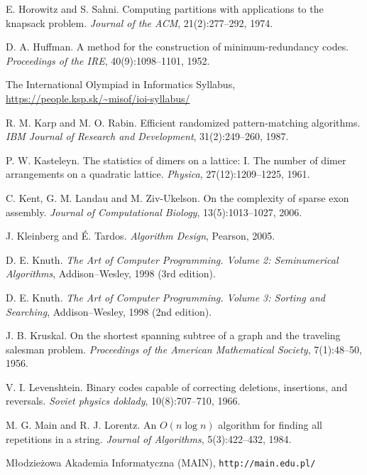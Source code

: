\begin{thebibliography}{9}
  E. Horowitz and S. Sahni.
  Computing partitions with applications to the knapsack problem.
  \emph{Journal of the ACM}, 21(2):277--292, 1974.

  D. A. Huffman.
  A method for the construction of minimum-redundancy codes.
  \emph{Proceedings of the IRE}, 40(9):1098--1101, 1952.

  The International Olympiad in Informatics Syllabus,
  \url{https://people.ksp.sk/~misof/ioi-syllabus/}

  R. M. Karp and M. O. Rabin.
  Efficient randomized pattern-matching algorithms.
  \emph{IBM Journal of Research and Development}, 31(2):249--260, 1987.

  P. W. Kasteleyn.  
  The statistics of dimers on a lattice: I. The number of dimer arrangements on a quadratic lattice.
  \emph{Physica}, 27(12):1209--1225, 1961.

  C. Kent, G. M. Landau and M. Ziv-Ukelson.
  On the complexity of sparse exon assembly.
  \emph{Journal of Computational Biology}, 13(5):1013--1027, 2006.


  J. Kleinberg and É. Tardos.
  \emph{Algorithm Design}, Pearson, 2005.

  D. E. Knuth.
  \emph{The Art of Computer Programming. Volume 2: Seminumerical Algorithms}, Addison–Wesley, 1998 (3rd edition).

  D. E. Knuth.
  \emph{The Art of Computer Programming. Volume 3: Sorting and Searching}, Addison–Wesley, 1998 (2nd edition).


  J. B. Kruskal.
  On the shortest spanning subtree of a graph and the traveling salesman problem.
  \emph{Proceedings of the American Mathematical Society}, 7(1):48--50, 1956.

  V. I. Levenshtein.
  Binary codes capable of correcting deletions, insertions, and reversals.
  \emph{Soviet physics doklady}, 10(8):707--710, 1966.

  M. G. Main and R. J. Lorentz.
  An $O(n \log n)$ algorithm for finding all repetitions in a string.
  \emph{Journal of Algorithms}, 5(3):422--432, 1984.

  Młodzieżowa Akademia Informatyczna (MAIN), \texttt{http://main.edu.pl/}


\end{thebibliography}
